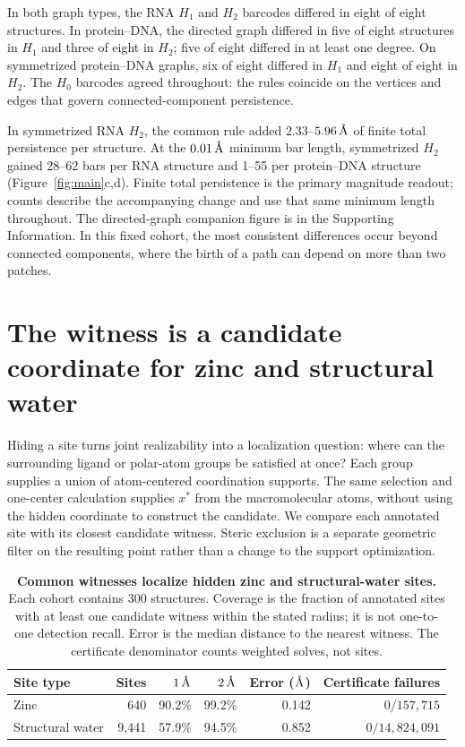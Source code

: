 \documentclass[11pt]{article}
\newcommand{\angstrom}{\ensuremath{\text{\normalfont\AA}}}
\begin{document}
In both graph types, the RNA $H_1$ and $H_2$ barcodes differed in eight of eight structures. In protein--DNA, the directed graph differed in five of eight structures in $H_1$ and three of eight in $H_2$; five of eight differed in at least one degree. On symmetrized protein--DNA graphs, six of eight differed in $H_1$ and eight of eight in $H_2$. The $H_0$ barcodes agreed throughout: the rules coincide on the vertices and edges that govern connected-component persistence.

In symmetrized RNA $H_2$, the common rule added $2.33$--$5.96\,\angstrom$ of finite total persistence per structure. At the $0.01\,\angstrom$ minimum bar length, symmetrized $H_2$ gained 28--62 bars per RNA structure and 1--55 per protein--DNA structure (Figure~\ref{fig:main}c,d). Finite total persistence is the primary magnitude readout; counts describe the accompanying change and use that same minimum length throughout. The directed-graph companion figure is in the Supporting Information. In this fixed cohort, the most consistent differences occur beyond connected components, where the birth of a path can depend on more than two patches.

\section{The witness is a candidate coordinate for zinc and structural water}
\label{sec:sites}

Hiding a site turns joint realizability into a localization question: where can the surrounding ligand or polar-atom groups be satisfied at once? Each group supplies a union of atom-centered coordination supports. The same selection and one-center calculation supplies $x^*$ from the macromolecular atoms, without using the hidden coordinate to construct the candidate. We compare each annotated site with its closest candidate witness. Steric exclusion is a separate geometric filter on the resulting point rather than a change to the support optimization.

\begin{table}[htbp]
\centering
\caption{\textbf{Common witnesses localize hidden zinc and structural-water sites.} Each cohort contains 300 structures. Coverage is the fraction of annotated sites with at least one candidate witness within the stated radius; it is not one-to-one detection recall. Error is the median distance to the nearest witness. The certificate denominator counts weighted solves, not sites.}
\label{tab:sites}
\begin{tabular}{@{}lrrrrr@{}}
\toprule
Site type & Sites & $1\,\angstrom$ & $2\,\angstrom$ & Error (\angstrom) & Certificate failures \\
\midrule
Zinc & 640 & 90.2\% & 99.2\% & 0.142 & $0/157{,}715$ \\
Structural water & 9{,}441 & 57.9\% & 94.5\% & 0.852 & $0/14{,}824{,}091$ \\
\bottomrule
\end{tabular}
\end{table}
\end{document}
